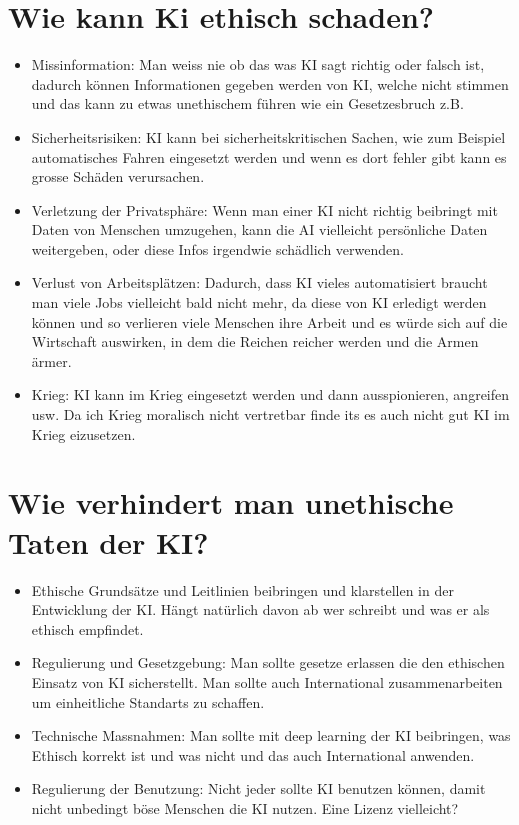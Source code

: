 \documentclass{report}
\begin{document}
\section{Wie kann Ki ethisch schaden?}
\begin{itemize}
    \item Missinformation: Man weiss nie ob das was KI sagt richtig oder falsch ist, dadurch können Informationen gegeben werden von KI, welche nicht stimmen und das kann zu etwas unethischem führen wie ein Gesetzesbruch z.B.
    \item Sicherheitsrisiken: KI kann bei sicherheitskritischen Sachen, wie zum Beispiel automatisches Fahren eingesetzt werden und wenn es dort fehler gibt kann es grosse Schäden verursachen.
    \item Verletzung der Privatsphäre: Wenn man einer KI nicht richtig beibringt mit Daten von Menschen umzugehen, kann die AI vielleicht persönliche Daten weitergeben, oder diese Infos irgendwie schädlich verwenden.
    \item Verlust von Arbeitsplätzen: Dadurch, dass KI vieles automatisiert braucht man viele Jobs vielleicht bald nicht mehr, da diese von KI erledigt werden können und so verlieren viele Menschen ihre Arbeit und es würde sich auf die Wirtschaft auswirken, in dem die Reichen reicher werden und die Armen ärmer.
    \item Krieg: KI kann im Krieg eingesetzt werden und dann ausspionieren, angreifen usw. Da ich Krieg moralisch nicht vertretbar finde its es auch nicht gut KI im Krieg eizusetzen.
\end{itemize}

\section{Wie verhindert man unethische Taten der KI?}
\begin{itemize}
    \item Ethische Grundsätze und Leitlinien beibringen und klarstellen in der Entwicklung der KI. Hängt natürlich davon ab wer schreibt und was er als ethisch empfindet.
    \item Regulierung und Gesetzgebung: Man sollte gesetze erlassen die den ethischen Einsatz von KI sicherstellt. Man sollte auch International zusammenarbeiten um einheitliche Standarts zu schaffen.
    \item Technische Massnahmen: Man sollte mit deep learning der KI beibringen, was Ethisch korrekt ist und was nicht und das auch International anwenden.
    \item Regulierung der Benutzung: Nicht jeder sollte KI benutzen können, damit nicht unbedingt böse Menschen die KI nutzen. Eine Lizenz vielleicht? 
\end{itemize}
\end{document}
